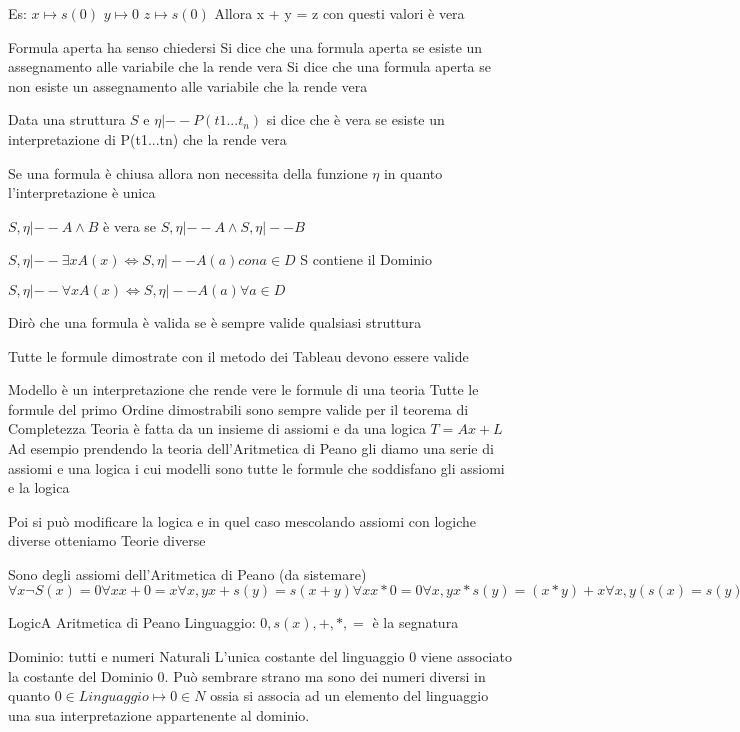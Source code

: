 \begin{defi}
Es:
$x \mapsto s(0)$
$y \mapsto 0$
$z \mapsto s(0)$
Allora x + y = z con questi valori è vera

Formula aperta ha senso chiedersi
Si dice che una formula aperta    se esiste un assegnamento alle variabile che la rende vera
Si dice che una formula aperta se non esiste un assegnamento alle variabile che la rende vera

Data una struttura $S $ e $\eta |-- P(t1...t_n)$ si dice che è vera se esiste un interpretazione di P(t1...tn) che la rende vera

Se una formula è chiusa allora non necessita della funzione $\eta$ in quanto l'interpretazione è unica

$S,\eta |-- A \land B$ è vera se $S,\eta |-- A \land S,\eta |-- B$

$S,\eta |-- \exists x A(x) \iff S,\eta |-- A(a) con a \in D$  S contiene il Dominio

$S,\eta |-- \forall x A(x) \iff S,\eta |-- A(a) \forall a \in D$

Dirò che una formula è valida se è sempre valide qualsiasi struttura

Tutte le formule dimostrate con il metodo dei Tableau devono essere valide

Modello è un interpretazione che rende vere le formule di una teoria
Tutte le formule del primo Ordine dimostrabili sono sempre valide per il teorema di Completezza
Teoria è fatta da un insieme di assiomi e da una logica $T = Ax + L$
Ad esempio prendendo la teoria dell'Aritmetica di Peano gli diamo una serie di assiomi e una logica
i cui modelli sono tutte le formule che soddisfano gli assiomi e la logica

Poi si può modificare la logica e in quel caso mescolando assiomi con logiche diverse otteniamo Teorie diverse

Sono degli assiomi dell'Aritmetica di Peano (da sistemare)
$\forall x \neg S(x) = 0
\forall x x + 0 = x
\forall x,y x + s(y) = s(x + y)
\forall x x * 0 = 0
\forall x,y x * s(y) = (x * y) + x
\forall x,y (s(x) = s(y)) \rightarrow x = y
P(0)
\neg D(0)
\forall x (P(x) \rightarrow \neg P(s(x))) P indica i numeri Pari
\forall x (D(x) \rightarrow \neg D(S(x))) D indica i numeri Dispari $

LogicA Aritmetica di Peano
Linguaggio: $0,s(x),+,*,=$ è la segnatura

Dominio: tutti e numeri Naturali
L'unica costante del linguaggio $0$ viene associato la costante del Dominio $0$.
 Può sembrare strano ma sono dei numeri diversi in quanto $0 \in Linguaggio \mapsto 0 \in N$
  ossia si associa ad un elemento del linguaggio una sua interpretazione appartenente al dominio.


\end{defi}
